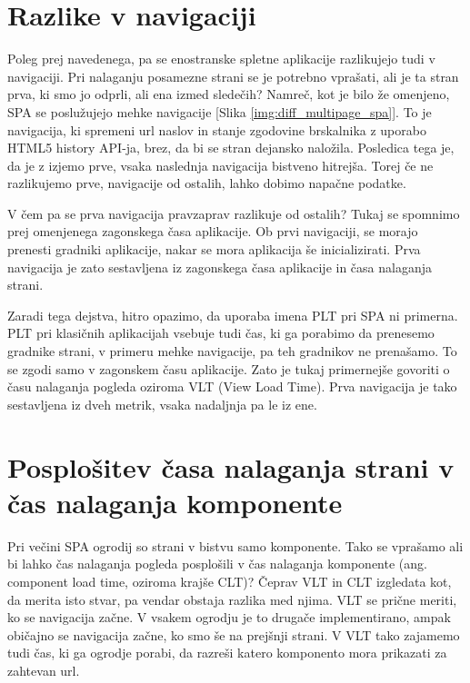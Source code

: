 \documentclass[a4paper, 12pt]{book}
\begin{document}
\FloatBarrier

\section{Razlike v navigaciji}

Poleg prej navedenega, pa se enostranske spletne aplikacije razlikujejo tudi v navigaciji. Pri nalaganju posamezne strani se je potrebno vprašati, ali je ta stran prva, ki smo jo odprli, ali ena izmed sledečih? Namreč, kot je bilo že omenjeno, SPA se poslužujejo mehke navigacije [Slika \ref{img:diff_multipage_spa}]. To je navigacija, ki spremeni url naslov in stanje zgodovine brskalnika z uporabo HTML5 history API-ja, brez, da bi se stran dejansko naložila. Posledica tega je, da je z izjemo prve, vsaka naslednja navigacija bistveno hitrejša. Torej če ne razlikujemo prve,  navigacije od ostalih, lahko  dobimo napačne podatke.

V čem pa se prva navigacija pravzaprav razlikuje od ostalih? Tukaj se spomnimo prej omenjenega zagonskega časa aplikacije. Ob prvi navigaciji, se morajo prenesti gradniki aplikacije, nakar se mora aplikacija še inicializirati. Prva navigacija je zato sestavljena iz zagonskega časa aplikacije in časa nalaganja strani.

Zaradi tega dejstva, hitro opazimo, da uporaba imena PLT pri SPA ni primerna. PLT pri klasičnih aplikacijah vsebuje tudi čas, ki ga porabimo da prenesemo gradnike strani, v primeru mehke navigacije, pa teh gradnikov ne prenašamo. To se zgodi samo v zagonskem času aplikacije. Zato je tukaj primernejše govoriti o času nalaganja pogleda oziroma VLT (View Load Time). Prva navigacija je tako sestavljena iz dveh metrik, vsaka nadaljnja pa le iz ene.

\section{Posplošitev časa nalaganja strani v čas nalaganja komponente}

Pri večini SPA ogrodij so strani v bistvu samo komponente. Tako se vprašamo ali bi lahko čas nalaganja pogleda posplošili v čas nalaganja komponente (ang. component load time, oziroma krajše CLT)? Čeprav VLT in CLT izgledata kot, da merita isto stvar, pa vendar obstaja razlika med njima. VLT se prične meriti, ko se navigacija začne. V vsakem ogrodju je to drugače implementirano, ampak običajno se navigacija začne, ko smo še na prejšnji strani. V VLT tako zajamemo tudi čas, ki ga ogrodje porabi, da razreši katero komponento mora prikazati za zahtevan url.
\end{document}
